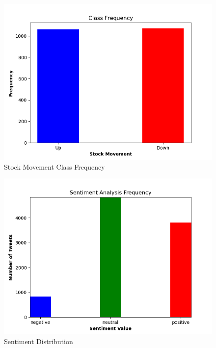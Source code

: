 \documentclass[12pt, notitlepage]{article}
\begin{document}
\begin{figure}[H]
	\centering
	\includegraphics[scale=0.8]{images/Class_Distribution.png}
	\caption{Stock Movement Class Frequency}
	\label{fig:SM}
\end{figure}
\begin{figure}[H]
	\centering
	\includegraphics[scale=0.8]{images/sentiment_distribution.png}
	\caption{Sentiment Distribution}
	\label{fig:SD}
\end{figure}
\end{document}
